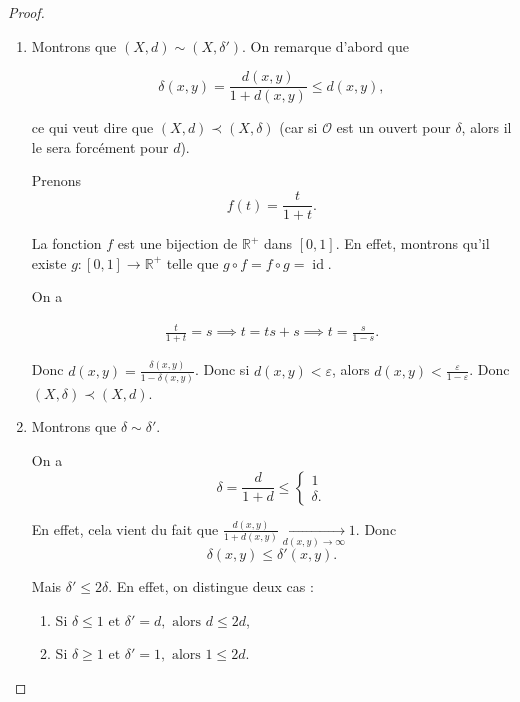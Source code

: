 \documentclass[french]{book}
\theoremstyle{definition}
\newcommand{\lesss}{<}
\newcommand{\less}{\lesss}
\begin{document}
\begin{proof}

  \

  \begin{enumerate}
    \item Montrons que \((X, d) \sim (X, \delta')\). On remarque d'abord que

    \[\delta(x,y) = \frac{d(x,y)}{1+ d(x,y)} \leq d(x,y), \]

    ce qui veut dire que \((X, d) \prec (X, \delta)\) (car si \(\mathcal{O}\) est un ouvert pour \(\delta\), alors il le sera forcément pour \(d\)).

    Prenons
    \begin{equation}\label{bij-dist}
      f(t) = \frac{t}{1+t}.
    \end{equation}

    La fonction \(f\) est une bijection de \(\mathbb{R} ^{+}\) dans \([0, 1]\). En effet, montrons qu'il existe \(g : [0, 1] \to \mathbb{R} ^{+}\) telle que $g \circ f = f \circ g = \operatorname{id}$.

    On a

    \begin{gather*}
      \frac{t}{1+t} = s \implies t = ts+s \implies t = \frac{s}{1-s}.
    \end{gather*}

    Donc \(d(x,y) = \frac{\delta(x,y)}{1 - \delta(x,y)}\). Donc si \(d(x,y) \less \varepsilon\), alors \(d(x,y) \less \frac{\varepsilon}{1- \varepsilon}\). Donc \((X,\delta) \prec (X,d)\).

    \item Montrons que \(\delta \sim \delta'\).

    On a \[\delta = \frac{d}{1+d} \leq \begin{cases}
      1 \\
      \delta.
    \end{cases}\]

    En effet, cela vient du fait que \(\frac{d(x,y)}{1+d(x,y)} \underset{d(x,y) \to \infty }{\longrightarrow} 1\). Donc \[\delta(x,y) \leq \delta'(x,y).\]

    Mais \(\delta' \leq 2 \delta\). En effet, on distingue deux cas :

    \begin{enumerate}
      \item Si \(\delta \leq  1 \text{ et } \delta' = d, \text{ alors } d \leq 2 d \),
      \item Si \(\delta \geq  1 \text{ et } \delta' = 1, \text{ alors } 1 \leq 2 d \).
    \end{enumerate}


\end{enumerate}
\end{proof}
\end{document}
